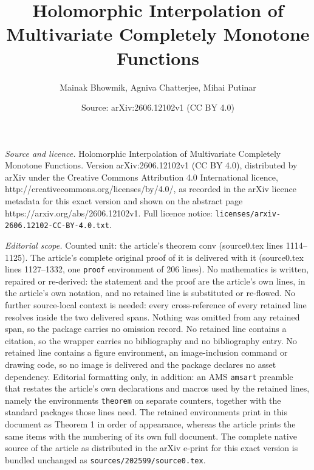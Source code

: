 \documentclass[10pt,a4paper]{amsart}
\title{Holomorphic Interpolation of Multivariate Completely Monotone Functions}
\author{Mainak Bhowmik, Agniva Chatterjee, Mihai Putinar}
\date{Source: arXiv:2606.12102v1 (CC BY 4.0)}
\begin{document}
\maketitle

\noindent\emph{Source and licence.} Holomorphic Interpolation of Multivariate Completely Monotone Functions. Version arXiv:2606.12102v1 (CC BY 4.0), distributed by arXiv under the Creative Commons Attribution 4.0 International licence, http://creativecommons.org/licenses/by/4.0/, as recorded in the arXiv licence metadata for this exact version and shown on the abstract page https://arxiv.org/abs/2606.12102v1. Full licence notice: \texttt{licenses/arxiv-2606.12102-CC-BY-4.0.txt}.\par\smallskip

\noindent\textit{Editorial scope.} Counted unit: the article's theorem conv (source0.tex lines 1114--1125). The article's complete original proof of it is delivered with it (source0.tex lines 1127--1332, one \texttt{proof} environment of 206 lines). No mathematics is written, repaired or re-derived: the statement and the proof are the article's own lines, in the article's own notation, and no retained line is substituted or re-flowed.  No further source-local context is needed: every cross-reference of every retained line resolves inside the two delivered spans.  Nothing was omitted from any retained span, so the package carries no omission record.  No retained line contains a citation, so the wrapper carries no bibliography and no bibliography entry.  No retained line contains a figure environment, an image-inclusion command or drawing code, so no image is delivered and the package declares no asset dependency.  Editorial formatting only, in addition: an AMS \texttt{amsart} preamble that restates the article's own declarations and macros used by the retained lines, namely the environments \texttt{theorem} on separate counters, together with the standard packages those lines need.  The retained environments print in this document as Theorem 1 in order of appearance, whereas the article prints the same items with the numbering of its own full document.  The complete native source of the article as distributed in the arXiv e-print for this exact version is bundled unchanged as \texttt{sources/202599/source0.tex}.
\end{document}
